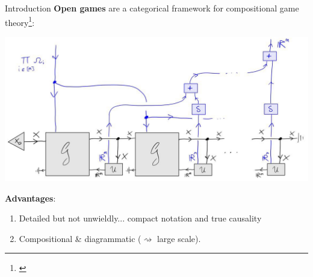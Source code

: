 \begin{frame}{Introduction}
	\textbf{Open games} are a categorical framework for compositional game theory\footnote[frame]{\cite{ghani2018compositional}}:

	\vfill
	\begin{center}
		\includegraphics[width=.85\textwidth]{figures/og_ex.png}
	\end{center}

	\vfill
	\textbf{Advantages}:
	\begin{enumerate}
		\item Detailed but not unwieldly... compact notation and true causality
		\item Compositional \& diagrammatic (\textcolor{coloraccent}{$\rightsquigarrow$ large scale}).\\
	\end{enumerate}
\end{frame}

